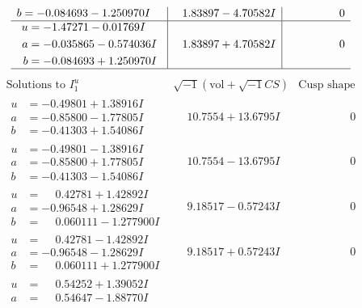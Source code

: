 \documentclass[1p]{elsarticle_modified}
\theoremstyle{definition}
\newcommand{\I}{\sqrt{-1}}
\begin{document}
$$\begin{array}{c|c|c}
\begin{aligned}
b &= -0.084693 - 1.250970 I\end{aligned}
 & \phantom{-}1.83897 - 4.70582 I & \phantom{-0.000000 } 0 \\ \hline\begin{aligned}
u &= -1.47271 - 0.01769 I \\
a &= -0.035865 - 0.574036 I \\
b &= -0.084693 + 1.250970 I\end{aligned}
 & \phantom{-}1.83897 + 4.70582 I & \phantom{-0.000000 } 0\\
 \hline 
 \end{array}$$\newpage$$\begin{array}{c|c|c}  
\text{Solutions to }I^u_{1}& \I (\text{vol} + \sqrt{-1}CS) & \text{Cusp shape}\\
 \hline 
\begin{aligned}
u &= -0.49801 + 1.38916 I \\
a &= -0.85800 - 1.77805 I \\
b &= -0.41303 + 1.54086 I\end{aligned}
 & \phantom{-}10.7554 + 13.6795 I & \phantom{-0.000000 } 0 \\ \hline\begin{aligned}
u &= -0.49801 - 1.38916 I \\
a &= -0.85800 + 1.77805 I \\
b &= -0.41303 - 1.54086 I\end{aligned}
 & \phantom{-}10.7554 - 13.6795 I & \phantom{-0.000000 } 0 \\ \hline\begin{aligned}
u &= \phantom{-}0.42781 + 1.42892 I \\
a &= -0.96548 + 1.28629 I \\
b &= \phantom{-}0.060111 - 1.277900 I\end{aligned}
 & \phantom{-}9.18517 - 0.57243 I & \phantom{-0.000000 } 0 \\ \hline\begin{aligned}
u &= \phantom{-}0.42781 - 1.42892 I \\
a &= -0.96548 - 1.28629 I \\
b &= \phantom{-}0.060111 + 1.277900 I\end{aligned}
 & \phantom{-}9.18517 + 0.57243 I & \phantom{-0.000000 } 0 \\ \hline\begin{aligned}
u &= \phantom{-}0.54252 + 1.39052 I \\
a &= \phantom{-}0.54647 - 1.88770 I \\

\end{aligned}
\end{array}$$
\end{document}

